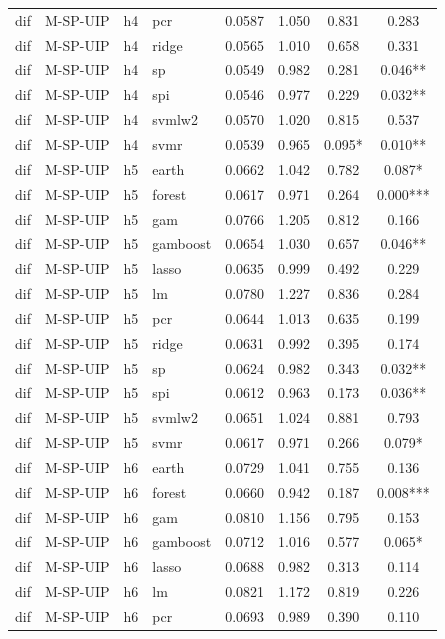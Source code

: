 \begin{ThreePartTable}
\begin{longtable}[t]{llclcccc}
dif & M-SP-UIP & h4 & pcr & 0.0587 & 1.050 & 0.831 & 0.283\\
dif & M-SP-UIP & h4 & ridge & 0.0565 & 1.010 & 0.658 & 0.331\\
dif & M-SP-UIP & h4 & sp & 0.0549 & 0.982 & 0.281 & 0.046**\\
dif & M-SP-UIP & h4 & spi & 0.0546 & 0.977 & 0.229 & 0.032**\\
dif & M-SP-UIP & h4 & svmlw2 & 0.0570 & 1.020 & 0.815 & 0.537\\
dif & M-SP-UIP & h4 & svmr & 0.0539 & 0.965 & 0.095* & 0.010**\\
\addlinespace
dif & M-SP-UIP & h5 & earth & 0.0662 & 1.042 & 0.782 & 0.087*\\
dif & M-SP-UIP & h5 & forest & 0.0617 & 0.971 & 0.264 & 0.000***\\
dif & M-SP-UIP & h5 & gam & 0.0766 & 1.205 & 0.812 & 0.166\\
dif & M-SP-UIP & h5 & gamboost & 0.0654 & 1.030 & 0.657 & 0.046**\\
dif & M-SP-UIP & h5 & lasso & 0.0635 & 0.999 & 0.492 & 0.229\\
dif & M-SP-UIP & h5 & lm & 0.0780 & 1.227 & 0.836 & 0.284\\
dif & M-SP-UIP & h5 & pcr & 0.0644 & 1.013 & 0.635 & 0.199\\
dif & M-SP-UIP & h5 & ridge & 0.0631 & 0.992 & 0.395 & 0.174\\
dif & M-SP-UIP & h5 & sp & 0.0624 & 0.982 & 0.343 & 0.032**\\
dif & M-SP-UIP & h5 & spi & 0.0612 & 0.963 & 0.173 & 0.036**\\
dif & M-SP-UIP & h5 & svmlw2 & 0.0651 & 1.024 & 0.881 & 0.793\\
dif & M-SP-UIP & h5 & svmr & 0.0617 & 0.971 & 0.266 & 0.079*\\
\addlinespace
dif & M-SP-UIP & h6 & earth & 0.0729 & 1.041 & 0.755 & 0.136\\
dif & M-SP-UIP & h6 & forest & 0.0660 & 0.942 & 0.187 & 0.008***\\
dif & M-SP-UIP & h6 & gam & 0.0810 & 1.156 & 0.795 & 0.153\\
dif & M-SP-UIP & h6 & gamboost & 0.0712 & 1.016 & 0.577 & 0.065*\\
dif & M-SP-UIP & h6 & lasso & 0.0688 & 0.982 & 0.313 & 0.114\\
dif & M-SP-UIP & h6 & lm & 0.0821 & 1.172 & 0.819 & 0.226\\
dif & M-SP-UIP & h6 & pcr & 0.0693 & 0.989 & 0.390 & 0.110\\

\end{longtable}
\end{ThreePartTable}
